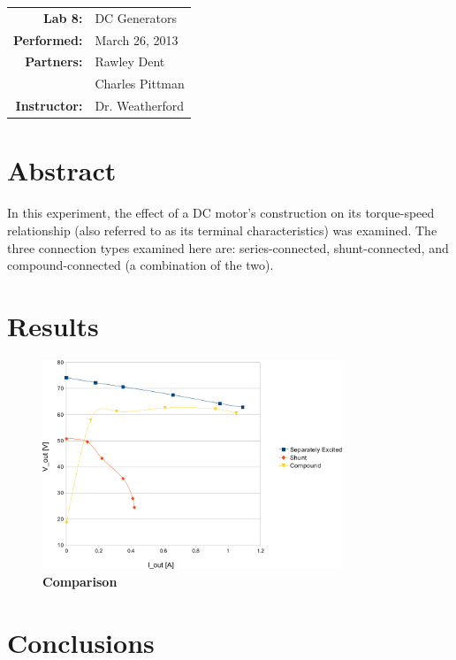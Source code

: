 \documentclass{article}
\begin{document}
\begin{tabular}{rl}
  \textbf{Lab 8:} & DC Generators \\
  \textbf{Performed:} & March 26, 2013 \\
  \textbf{Partners:} & Rawley Dent \\ & Charles Pittman \\
  \textbf{Instructor:} & Dr. Weatherford
\end{tabular}


\section*{Abstract}

In this experiment, the effect of a DC motor's construction on its torque-speed
relationship (also referred to as its terminal characteristics) was examined.
The three connection types examined here are: series-connected,
shunt-connected, and compound-connected (a combination of the two).

\section*{Results}

\begin{figure}[H]
  \centering
    \includegraphics[width=0.8\textwidth]{img/graph}
    \caption{\textbf{Comparison}}
    \label{fig:graph}
\end{figure}

\section*{Conclusions}
\end{document}
